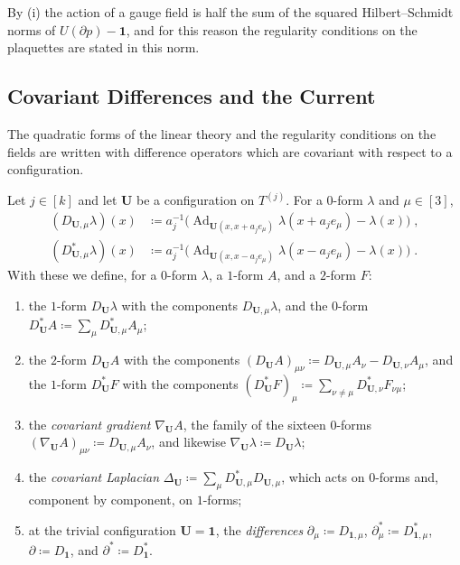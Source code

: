 \documentclass[11pt]{preprint}
\newcommand{\id}{\mathbf 1}
\newcommand{\Ad}{\operatorname{Ad}}
\numberwithin{equation}{section}
\begin{document}
By (i) the action of a gauge field is half the sum of the squared Hilbert--Schmidt norms of $U(\partial p) - \id$, and for this reason the regularity conditions on the plaquettes are stated in this norm.

\subsection{Covariant Differences and the Current}\label{sec:differences}

The quadratic forms of the linear theory and the regularity conditions on the fields are written with difference operators which are covariant with respect to a configuration.

\begin{definition}\label{def:differences}
Let $j \in [k]$ and let $\mathbf U$ be a configuration on $T^{(j)}$. For a $0$-form $\lambda$ and $\mu \in [3]$,
\begin{align}
    (D_{\mathbf U,\mu}\lambda)(x) &\coloneqq a_j^{-1}\bigl(\Ad_{\mathbf U(x, x + a_je_\mu)}\lambda(x + a_je_\mu) - \lambda(x)\bigr)\;,\label{eq:forward-difference}\\
    (D^*_{\mathbf U,\mu}\lambda)(x) &\coloneqq a_j^{-1}\bigl(\Ad_{\mathbf U(x, x - a_je_\mu)}\lambda(x - a_je_\mu) - \lambda(x)\bigr)\;.\label{eq:backward-difference}
\end{align}
With these we define, for a $0$-form $\lambda$, a $1$-form $A$, and a $2$-form $F$:
\begin{enumerate}[label=(\roman*)]
\item the $1$-form $D_{\mathbf U}\lambda$ with the components $D_{\mathbf U,\mu}\lambda$, and the $0$-form $D^*_{\mathbf U}A \coloneqq \sum_\mu D^*_{\mathbf U,\mu}A_\mu$;
\item the $2$-form $D_{\mathbf U}A$ with the components $(D_{\mathbf U}A)_{\mu\nu} \coloneqq D_{\mathbf U,\mu}A_\nu - D_{\mathbf U,\nu}A_\mu$, and the $1$-form $D^*_{\mathbf U}F$ with the components $(D^*_{\mathbf U}F)_\mu \coloneqq \sum_{\nu \neq \mu}D^*_{\mathbf U,\nu}F_{\nu\mu}$;
\item the \emph{covariant gradient} $\nabla_{\mathbf U}A$, the family of the sixteen $0$-forms $(\nabla_{\mathbf U}A)_{\mu\nu} \coloneqq D_{\mathbf U,\mu}A_\nu$, and likewise $\nabla_{\mathbf U}\lambda \coloneqq D_{\mathbf U}\lambda$;
\item the \emph{covariant Laplacian} $\Delta_{\mathbf U} \coloneqq \sum_\mu D^*_{\mathbf U,\mu}D_{\mathbf U,\mu}$, which acts on $0$-forms and, component by component, on $1$-forms;
\item at the trivial configuration $\mathbf U = \id$, the \emph{differences} $\partial_\mu \coloneqq D_{\id,\mu}$, $\partial^*_\mu \coloneqq D^*_{\id,\mu}$, $\partial \coloneqq D_{\id}$, and $\partial^* \coloneqq D^*_{\id}$.
\end{enumerate}
\end{definition}
\end{document}

